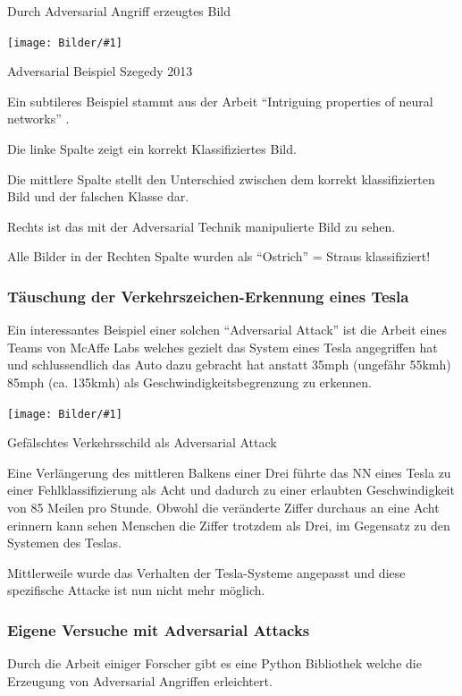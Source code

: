 \documentclass[
  12pt, %
  a4paper, %
  oneside, %
  openany, 
  numbers=noenddot, %
  BCOR=5mm, %
  parskip=half*, %
  thesis, %
]{bfhbook}
\newcommand{\imgText}[3]{
\begin{center}
    \begin{minipage}[t]{0.6\textwidth}
    		\vspace{0pt}
		\texttt{[image: Bilder/\#1]}
		\caption{#2}
	\end{minipage}\hfill
    \begin{minipage}[t]{0.4\textwidth}
    		\vspace{5pt}
  		#3
    \end{minipage}
\end{center}
}
\begin{document}
\begin{center}
\begin{minipage}[t]{0.45\linewidth}
	 \caption{Durch Adversarial Angriff erzeugtes Bild}
\end{minipage}
\end{center}

\imgText{adversarial.png}{Adversarial Beispiel Szegedy 2013}{
Ein subtileres Beispiel stammt aus der Arbeit ``Intriguing properties of neural networks'' \parencite{Szegedy2013}. 

Die linke Spalte zeigt ein korrekt Klassifiziertes Bild.

Die mittlere Spalte stellt den Unterschied zwischen dem korrekt klassifizierten Bild und der falschen Klasse dar.

Rechts ist das mit der Adversarial Technik manipulierte Bild zu sehen.


Alle Bilder in der Rechten Spalte wurden als ``Ostrich'' = Straus klassifiziert!
}

\subsubsection*{Täuschung der Verkehrszeichen-Erkennung eines Tesla}
Ein interessantes Beispiel einer solchen ``Adversarial Attack'' ist die Arbeit eines Teams von McAffe Labs welches gezielt das System eines Tesla angegriffen hat und schlussendlich das Auto dazu gebracht hat anstatt 35mph (ungefähr 55kmh)  85mph (ca. 135kmh) als Geschwindigkeitsbegrenzung zu erkennen.\\

\parencite{advTesla} 

\imgText{speed-limit-fake.png}{Gefälschtes Verkehrsschild als Adversarial Attack}{
Eine Verlängerung des mittleren Balkens einer Drei führte das \Gls{NN} eines Tesla zu einer Fehlklassifizierung als Acht und dadurch zu einer erlaubten Geschwindigkeit von 85 Meilen pro Stunde. Obwohl die veränderte Ziffer durchaus an eine Acht erinnern kann sehen Menschen die Ziffer trotzdem als Drei, im Gegensatz zu den Systemen des Teslas.


Mittlerweile wurde das Verhalten der Tesla-Systeme angepasst und diese spezifische Attacke ist nun nicht mehr möglich.
}

\subsubsection*{Eigene Versuche mit Adversarial Attacks}
Durch die Arbeit einiger Forscher \parencite{papernot2018cleverhans} gibt es eine Python Bibliothek \parencite{cleverHans} welche die Erzeugung von Adversarial Angriffen erleichtert.
\end{document}
